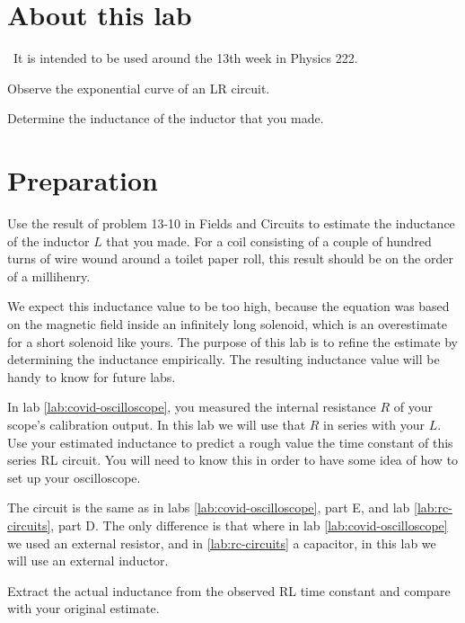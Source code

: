 \renewcommand\thechapter{c2.13b}
\label{lab:lr-circuit}

\section*{About this lab}

\covid\ 
It is intended to be used around the 13th week in Physics 222.

\apparatus
{}

\begin{goals}

\item[] Observe the exponential curve of an LR circuit.

\item[] Determine the inductance of the inductor that you made.
\end{goals}

\section*{Preparation}

Use the result of problem 13-10 in Fields and Circuits to estimate the
inductance of the inductor $L$ that you made. For a coil consisting of a couple of
hundred turns of wire wound around a toilet paper roll, this result should be
on the order of a millihenry.

We expect this inductance value to be too high, because the equation was based on the magnetic
field inside an infinitely long solenoid, which is an overestimate for a short solenoid
like yours. The purpose of this lab is to refine the estimate by determining the
inductance empirically. The resulting inductance value will be handy to know for
future labs.

In lab \ref{lab:covid-oscilloscope}, you measured the internal resistance $R$
of your scope's calibration output. In this lab we will use that $R$ in series
with your $L$. Use your estimated inductance to predict a rough value
the time constant of this series RL circuit. You will need to know this in
order to have some idea of how to set up your oscilloscope.

\observations

The circuit is the same as in labs \ref{lab:covid-oscilloscope}, part E, and
lab \ref{lab:rc-circuits}, part D. The only difference is that where in lab
\ref{lab:covid-oscilloscope} we used an external resistor, and in \ref{lab:rc-circuits}
a capacitor, in this lab we will use an external inductor.

\analysis

Extract the actual inductance from the observed RL time constant and compare with
your original estimate.